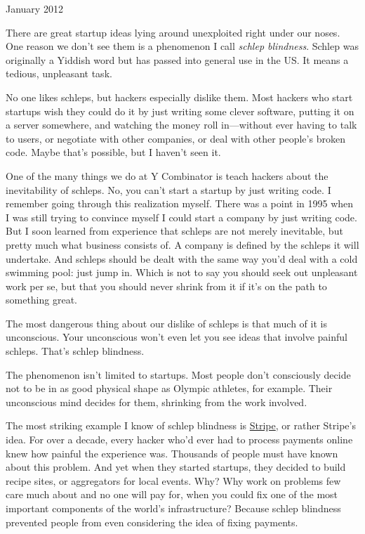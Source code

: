 January 2012

There are great startup ideas lying around unexploited right under our
noses. One reason we don't see them is a phenomenon I call \emph{schlep
blindness}. Schlep was originally a Yiddish word but has passed into
general use in the US. It means a tedious, unpleasant task.

No one likes schleps, but hackers especially dislike them. Most hackers
who start startups wish they could do it by just writing some clever
software, putting it on a server somewhere, and watching the money roll
in---without ever having to talk to users, or negotiate with other
companies, or deal with other people's broken code. Maybe that's
possible, but I haven't seen it.

One of the many things we do at Y Combinator is teach hackers about the
inevitability of schleps. No, you can't start a startup by just writing
code. I remember going through this realization myself. There was a
point in 1995 when I was still trying to convince myself I could start a
company by just writing code. But I soon learned from experience that
schleps are not merely inevitable, but pretty much what business
consists of. A company is defined by the schleps it will undertake. And
schleps should be dealt with the same way you'd deal with a cold
swimming pool: just jump in. Which is not to say you should seek out
unpleasant work per se, but that you should never shrink from it if it's
on the path to something great.

The most dangerous thing about our dislike of schleps is that much of it
is unconscious. Your unconscious won't even let you see ideas that
involve painful schleps. That's schlep blindness.

The phenomenon isn't limited to startups. Most people don't consciously
decide not to be in as good physical shape as Olympic athletes, for
example. Their unconscious mind decides for them, shrinking from the
work involved.

The most striking example I know of schlep blindness is
\href{http://stripe.com}{Stripe}, or rather Stripe's idea. For over a
decade, every hacker who'd ever had to process payments online knew how
painful the experience was. Thousands of people must have known about
this problem. And yet when they started startups, they decided to build
recipe sites, or aggregators for local events. Why? Why work on problems
few care much about and no one will pay for, when you could fix one of
the most important components of the world's infrastructure? Because
schlep blindness prevented people from even considering the idea of
fixing payments.

